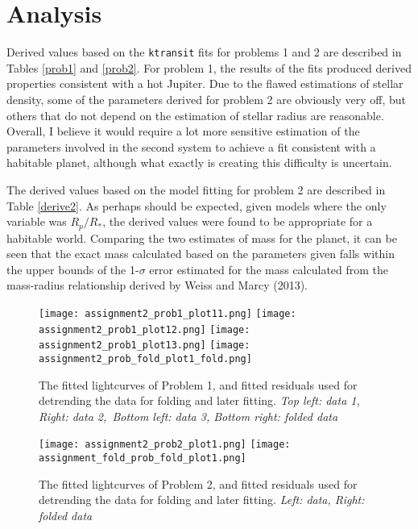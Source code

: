 \documentclass[10pt, preprint]{aastex}
\begin{document}
\vspace{-20pt}
\section*{Analysis}
Derived values based on the \verb|ktransit| fits for problems 1 and 2 are described in Tables \ref{prob1} and \ref{prob2}. For problem 1, the results of the fits produced derived properties consistent with a hot Jupiter. Due to the flawed estimations of stellar density, some of the parameters derived for problem 2 are obviously very off, but others that do not depend on the estimation of stellar radius are reasonable. Overall, I believe it would require a lot more sensitive estimation of the parameters involved in the second system to achieve a fit consistent with a habitable planet, although what exactly is creating this difficulty is uncertain. 

The derived values based on the model fitting for problem 2 are described in Table \ref{derive2}. As perhaps should be expected, given models where the only variable was $R_p/R_*$, the derived values were found to be appropriate for a habitable world. Comparing the two estimates of mass for the planet, it can be seen that the exact mass calculated based on the parameters given falls within the upper bounds of the 1-$\sigma$ error estimated for the mass calculated from the mass-radius relationship derived by Weiss and Marcy (2013).
\begin{figure}[!ht]
  \texttt{[image: assignment2\_prob1\_plot11.png]}
  \endminipage\hfill
  \texttt{[image: assignment2\_prob1\_plot12.png]}
  \endminipage\hfill
  \texttt{[image: assignment2\_prob1\_plot13.png]}
  \endminipage\hfill
  \texttt{[image: assignment2\_prob\_fold\_plot1\_fold.png]}
  \endminipage\hfill
  \caption{The fitted lightcurves of Problem 1, and fitted residuals used for detrending the data for folding and later fitting. \protect\label{fig1}
    \protect    \emph{Top left: data 1, Right: data 2,\
      Bottom left: data 3, Bottom right: folded data}}
\end{figure}

\begin{figure}[!ht]
  \texttt{[image: assignment2\_prob2\_plot1.png]}
  \endminipage\hfill
  \texttt{[image: assignment\_fold\_prob\_fold\_plot1.png]}
  \endminipage\hfill
  \caption{The fitted lightcurves of Problem 2, and fitted residuals used for detrending the data for folding and later fitting.\protect\label{fig2}
    \protect    \emph{Left: data, Right: folded data}}
\end{figure}
\end{document}
